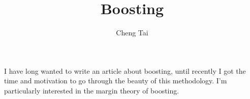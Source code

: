 \documentclass[12pt, reqno]{amsart}
\title{Boosting}
\author{Cheng Tai}
\date{}
\begin{document}
\maketitle

I have long wanted to write an article about boosting, until recently I got the time and motivation to go through the beauty of this methodology. I'm particularly interested in the margin theory of boosting.
\end{document}
